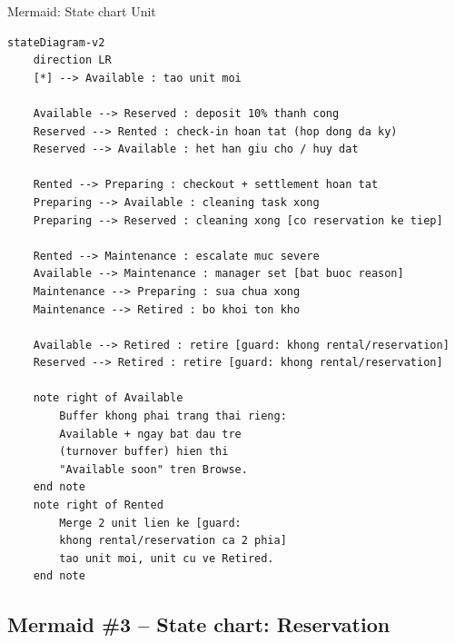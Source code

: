 \documentclass[12pt,a4paper]{article}
\renewcommand{\_}{\textunderscore\allowbreak}
\begin{document}
\begin{mermaidbox}{Mermaid: State chart Unit}
\begin{Verbatim}[fontsize=\small]
%% StorageHub - State chart: vong doi Unit (kho)
stateDiagram-v2
    direction LR
    [*] --> Available : tao unit moi

    Available --> Reserved : deposit 10% thanh cong
    Reserved --> Rented : check-in hoan tat (hop dong da ky)
    Reserved --> Available : het han giu cho / huy dat

    Rented --> Preparing : checkout + settlement hoan tat
    Preparing --> Available : cleaning task xong
    Preparing --> Reserved : cleaning xong [co reservation ke tiep]

    Rented --> Maintenance : escalate muc severe
    Available --> Maintenance : manager set [bat buoc reason]
    Maintenance --> Preparing : sua chua xong
    Maintenance --> Retired : bo khoi ton kho

    Available --> Retired : retire [guard: khong rental/reservation]
    Reserved --> Retired : retire [guard: khong rental/reservation]

    note right of Available
        Buffer khong phai trang thai rieng:
        Available + ngay bat dau tre
        (turnover buffer) hien thi
        "Available soon" tren Browse.
    end note
    note right of Rented
        Merge 2 unit lien ke [guard:
        khong rental/reservation ca 2 phia]
        tao unit moi, unit cu ve Retired.
    end note
\end{Verbatim}
\end{mermaidbox}

\subsection{Mermaid \#3 -- State chart: Reservation}
\end{document}
